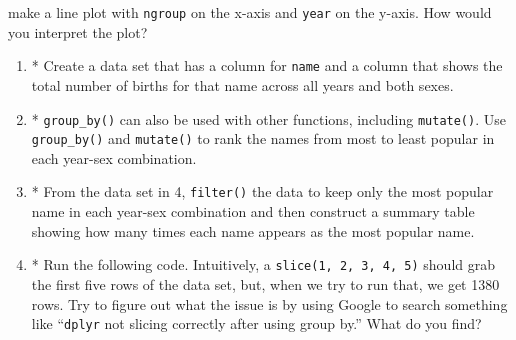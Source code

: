 \documentclass[
]{book}
\begin{document}
make a line plot with \texttt{ngroup} on the x-axis and \texttt{year} on the y-axis. How would you interpret the plot?

\begin{enumerate}
\def\labelenumi{\arabic{enumi}.}
\setcounter{enumi}{2}
\item
  * Create a data set that has a column for \texttt{name} and a column that shows the total number of births for that name across all years and both sexes.
\item
  * \texttt{group\_by()} can also be used with other functions, including \texttt{mutate()}. Use \texttt{group\_by()} and \texttt{mutate()} to rank the names from most to least popular in each year-sex combination.
\item
  * From the data set in 4, \texttt{filter()} the data to keep only the most popular name in each year-sex combination and then construct a summary table showing how many times each name appears as the most popular name.
\item
  * Run the following code. Intuitively, a \texttt{slice(1,\ 2,\ 3,\ 4,\ 5)} should grab the first five rows of the data set, but, when we try to run that, we get 1380 rows. Try to figure out what the issue is by using Google to search something like ``\texttt{dplyr} not slicing correctly after using group by.'' What do you find?
\end{enumerate}
\end{document}
